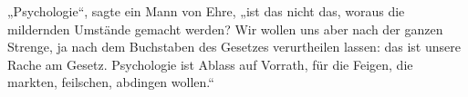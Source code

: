 „Psychologie“, sagte ein Mann von Ehre, „ist das nicht das, woraus die mildernden Umstände gemacht werden? Wir wollen uns aber nach der ganzen Strenge, ja nach dem Buchstaben des Gesetzes verurtheilen lassen: das ist unsere Rache am Gesetz. Psychologie ist Ablass auf Vorrath, für die Feigen, die markten, feilschen, abdingen wollen.“
\par

